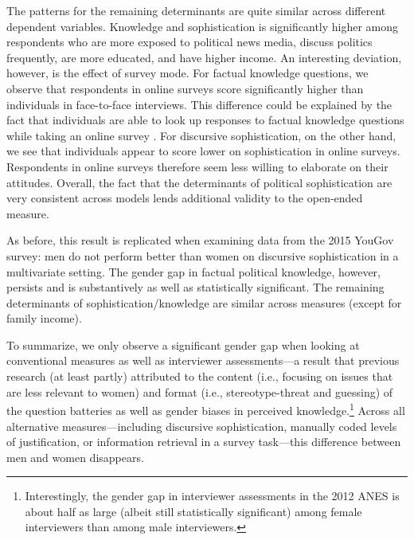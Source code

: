 \documentclass[12pt]{article}
\begin{document}
The patterns for the remaining determinants are quite similar across different dependent variables. Knowledge and sophistication is significantly higher among respondents who are more exposed to political news media, discuss politics frequently, are more educated, and have higher income. An interesting deviation, however, is the effect of survey mode. For factual knowledge questions, we observe that respondents in online surveys score significantly higher than individuals in face-to-face interviews. This difference could be explained by the fact that individuals are able to look up responses to factual knowledge questions while taking an online survey \citep[see also][]{clifford2016cheating}. For discursive sophistication, on the other hand, we see that individuals appear to score lower on sophistication in online surveys. Respondents in online surveys therefore seem less willing to elaborate on their attitudes. Overall, the fact that the determinants of political sophistication are very consistent across models lends additional validity to the open-ended measure.

As before, this result is replicated when examining data from the 2015 YouGov survey: men do not perform better than women on discursive sophistication in a multivariate setting. The gender gap in factual political knowledge, however, persists and is substantively as well as statistically significant. The remaining determinants of sophistication/knowledge are similar across measures (except for family income).


To summarize, we only observe a significant gender gap when looking at conventional measures as well as interviewer assessments---a result that previous research (at least partly) attributed to the content (i.e., focusing on issues that are less relevant to women) and format (i.e., stereotype-threat and guessing) of the question batteries as well as gender biases in perceived knowledge.\footnote{Interestingly, the gender gap in interviewer assessments in the 2012 ANES is about half as large (albeit still statistically significant) among female interviewers than among male interviewers.} Across all alternative measures---including discursive sophistication, manually coded levels of justification, or information retrieval in a survey task---this difference between men and women disappears.
\end{document}
